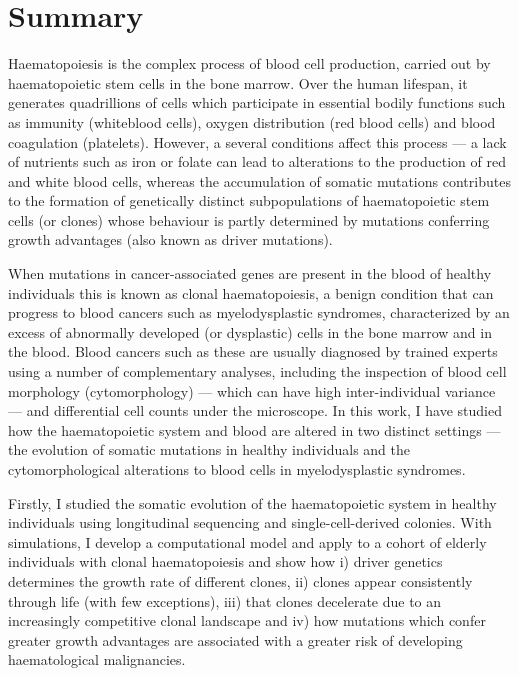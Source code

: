 \chapter{Summary}

Haematopoiesis is the complex process of blood cell production, carried out by haematopoietic stem cells in the bone marrow. Over the human lifespan, it generates quadrillions of cells which participate in essential bodily functions such as immunity (whiteblood cells), oxygen distribution (red blood cells) and blood coagulation (platelets). However, a several conditions affect this process --- a lack of nutrients such as iron or folate can lead to alterations to the production of red and white blood cells, whereas the accumulation of somatic mutations contributes to the formation of genetically distinct subpopulations of haematopoietic stem cells (or clones) whose behaviour is partly determined by mutations conferring growth advantages (also known as driver mutations). 

When mutations in cancer-associated genes are present in the blood of healthy individuals this is known as clonal haematopoiesis, a benign condition that can progress to blood cancers such as myelodysplastic syndromes, characterized by an excess of abnormally developed (or dysplastic) cells in the bone marrow and in the blood. Blood cancers such as these are usually diagnosed by trained experts using a number of complementary analyses, including the inspection of blood cell morphology (cytomorphology) --- which can have high inter-individual variance --- and differential cell counts under the microscope.
In this work, I have studied how the haematopoietic system and blood are altered in two distinct settings --- the evolution of somatic mutations in healthy individuals and the cytomorphological alterations to blood cells in myelodysplastic syndromes.

Firstly, I studied the somatic evolution of the haematopoietic system in healthy individuals using longitudinal sequencing and single-cell-derived colonies. With simulations, I develop a computational model and apply to a cohort of elderly individuals with clonal haematopoiesis and show how i) driver genetics determines the growth rate of different clones, ii) clones appear consistently through life (with few exceptions), iii) that clones decelerate due to an increasingly competitive clonal landscape and iv) how mutations which confer greater growth advantages are associated with a greater risk of developing haematological malignancies.

